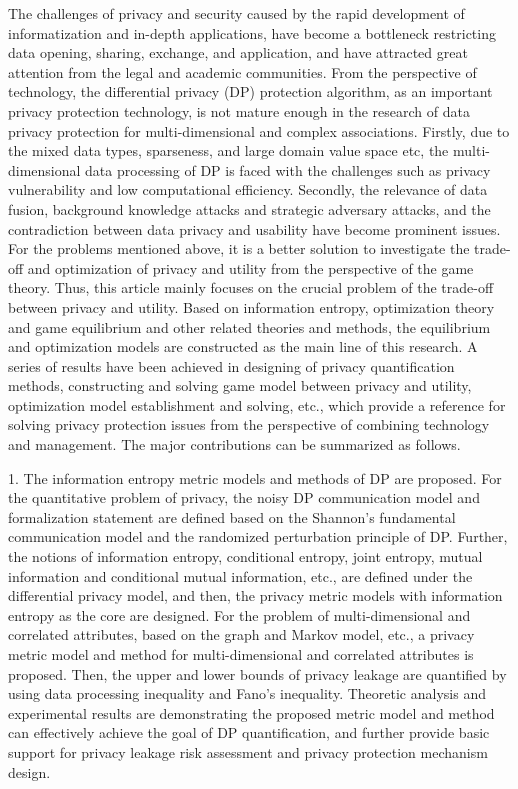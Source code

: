 \begin{englishabstract}
 The challenges of privacy and security caused by the rapid development of informatization and in-depth applications, have become a bottleneck restricting data opening, sharing, exchange, and application, and have attracted great attention from the legal and academic communities. From the perspective of technology, the differential privacy (DP) protection algorithm, as an important privacy protection technology, is not mature enough in the research of data privacy protection for multi-dimensional and complex associations. Firstly, due to the mixed data types, sparseness, and large domain value space etc, the multi-dimensional data processing of DP is faced with the challenges such as privacy vulnerability and low computational efficiency. Secondly, the relevance of data fusion, background knowledge attacks and strategic adversary attacks, and the contradiction between data privacy and usability have become prominent issues. For the problems mentioned above, it is a better solution to investigate the trade-off and optimization of privacy and utility from the perspective of the game theory. Thus, this article mainly focuses on the crucial problem of the trade-off between privacy and utility. Based on information entropy, optimization theory and game equilibrium and other related theories and methods, the equilibrium and optimization models are constructed as the main line of this research. A series of results have been achieved in designing of privacy quantification methods, constructing and solving game model between privacy and utility, optimization model establishment and solving, etc., which provide a reference for solving privacy protection issues from the perspective of combining technology and management. The major contributions can be summarized as follows.

1. The information entropy metric models and methods of DP are proposed. For the quantitative problem of privacy, the noisy DP communication model and formalization statement are defined based on the Shannon's fundamental communication model and the randomized perturbation principle of DP. Further, the notions of information entropy, conditional entropy, joint entropy, mutual information and conditional mutual information, etc., are defined under the differential privacy model, and then, the privacy metric models with information entropy as the core are designed. For the problem of multi-dimensional and correlated attributes, based on the graph and Markov model, etc., a privacy metric model and method for multi-dimensional and correlated attributes is proposed. Then, the upper and lower bounds of privacy leakage are quantified by using data processing inequality and Fano's inequality. Theoretic analysis and experimental results are demonstrating the proposed metric model and method can effectively achieve the goal of DP quantification, and further provide basic support for privacy leakage risk assessment and privacy protection mechanism design.



\end{englishabstract}
